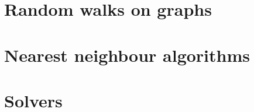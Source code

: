 \section{Random walks on graphs}
\label{sec:randomWalks}


\section{Nearest neighbour algorithms}
\label{sec:nearestNeighbourAlgorithms}


\section{Solvers}
\label{sec:solvers}

